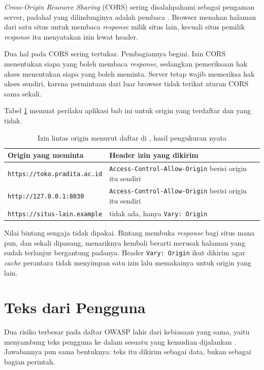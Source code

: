 \textit{Cross-Origin Resource Sharing} (CORS) sering disalahpahami sebagai
pengaman server, padahal yang dilindunginya adalah pembaca
\cite{whatwg-fetch}. Browser menahan halaman dari satu situs untuk membaca
\textit{response} milik situs lain, kecuali situs pemilik \textit{response}
itu menyatakan izin lewat header.

Dua hal pada CORS sering tertukar. Pembagiannya begini. Izin CORS menentukan
siapa yang boleh membaca \textit{response}, sedangkan pemeriksaan hak akses
menentukan siapa yang boleh meminta. Server tetap wajib memeriksa hak akses
sendiri, karena permintaan dari luar browser tidak terikat aturan CORS sama
sekali.

Tabel \ref{tab:cors} memuat perilaku aplikasi bab ini untuk origin yang
terdaftar dan yang tidak.

\begin{table}[!htb]
  \centering
  \caption{Izin lintas origin menurut daftar di
           , hasil pengukuran nyata}
  \label{tab:cors}
  \begin{tabularx}{\textwidth}{lX}
    \hline
    \textbf{Origin yang meminta} & \textbf{Header izin yang dikirim} \\
    \hline
    \texttt{https://toko.pradita.ac.id} & \texttt{Access-Control-Allow-Origin} berisi origin itu sendiri \\
    \hline
    \texttt{http://127.0.0.1:8030} & \texttt{Access-Control-Allow-Origin} berisi origin itu sendiri \\
    \hline
    \texttt{https://situs-lain.example} & tidak ada, hanya \texttt{Vary: Origin} \\
    \hline
  \end{tabularx}
\end{table}

Nilai bintang sengaja tidak dipakai. Bintang membuka \textit{response} bagi
situs mana pun, dan sekali dipasang, menariknya kembali berarti merusak
halaman yang sudah terlanjur bergantung padanya. Header \texttt{Vary: Origin}
ikut dikirim agar \textit{cache} perantara tidak menyimpan satu izin lalu
memakainya untuk origin yang lain.

\section{Teks dari Pengguna}

Dua risiko terbesar pada daftar OWASP lahir dari kebiasaan yang sama, yaitu
menyambung teks pengguna ke dalam sesuatu yang kemudian dijalankan
\cite{owasp-top10}. Jawabannya pun sama bentuknya: teks itu dikirim sebagai
data, bukan sebagai bagian perintah.

